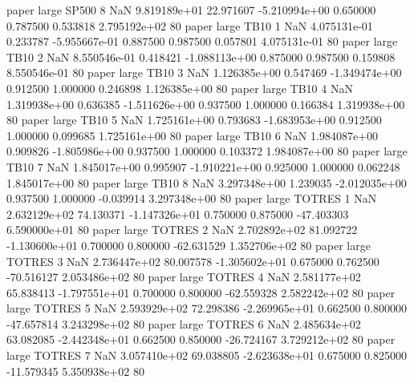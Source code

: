             paper      large    SP500                 8                  NaN 9.819189e+01     22.971607 -5.210994e+00 0.650000 0.787500       0.533818 2.795192e+02 80
            paper      large     TB10                 1                  NaN 4.075131e-01      0.233787 -5.955667e-01 0.887500 0.987500       0.057801 4.075131e-01 80
            paper      large     TB10                 2                  NaN 8.550546e-01      0.418421 -1.088113e+00 0.875000 0.987500       0.159808 8.550546e-01 80
            paper      large     TB10                 3                  NaN 1.126385e+00      0.547469 -1.349474e+00 0.912500 1.000000       0.246898 1.126385e+00 80
            paper      large     TB10                 4                  NaN 1.319938e+00      0.636385 -1.511626e+00 0.937500 1.000000       0.166384 1.319938e+00 80
            paper      large     TB10                 5                  NaN 1.725161e+00      0.793683 -1.683953e+00 0.912500 1.000000       0.099685 1.725161e+00 80
            paper      large     TB10                 6                  NaN 1.984087e+00      0.909826 -1.805986e+00 0.937500 1.000000       0.103372 1.984087e+00 80
            paper      large     TB10                 7                  NaN 1.845017e+00      0.995907 -1.910221e+00 0.925000 1.000000       0.062248 1.845017e+00 80
            paper      large     TB10                 8                  NaN 3.297348e+00      1.239035 -2.012035e+00 0.937500 1.000000      -0.039914 3.297348e+00 80
            paper      large   TOTRES                 1                  NaN 2.632129e+02     74.130371 -1.147326e+01 0.750000 0.875000     -47.403303 6.590000e+01 80
            paper      large   TOTRES                 2                  NaN 2.702892e+02     81.092722 -1.130600e+01 0.700000 0.800000     -62.631529 1.352706e+02 80
            paper      large   TOTRES                 3                  NaN 2.736447e+02     80.007578 -1.305602e+01 0.675000 0.762500     -70.516127 2.053486e+02 80
            paper      large   TOTRES                 4                  NaN 2.581177e+02     65.838413 -1.797551e+01 0.700000 0.800000     -62.559328 2.582242e+02 80
            paper      large   TOTRES                 5                  NaN 2.593929e+02     72.298386 -2.269965e+01 0.662500 0.800000     -47.657814 3.243298e+02 80
            paper      large   TOTRES                 6                  NaN 2.485634e+02     63.082085 -2.442348e+01 0.662500 0.850000     -26.724167 3.729212e+02 80
            paper      large   TOTRES                 7                  NaN 3.057410e+02     69.038805 -2.623638e+01 0.675000 0.825000     -11.579345 5.350938e+02 80
